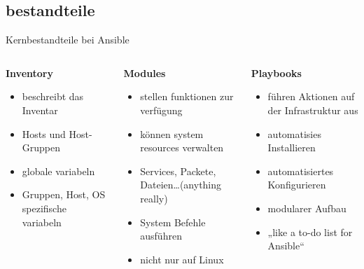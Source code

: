 \documentclass[aspectratio=169]{beamer}
\begin{document}
\subsection{bestandteile} 
\begin{frame}{Kernbestandteile bei Ansible}
    \begin{columns}
        \begin{column}{0.33\textwidth}
            \textbf{Inventory}
            \begin{itemize}
                \item beschreibt das Inventar
                \item Hosts und Host-Gruppen
                \item globale variabeln
                \item Gruppen, Host, OS spezifische variabeln
            \end{itemize}
        \end{column}
        \pause
        \begin{column}{0.33\textwidth}
            \textbf{Modules}
            \begin{itemize}
                \item stellen funktionen zur verfügung
                \item können system resources verwalten
                \item Services, Packete, Dateien\ldots (anything really)
                \item System Befehle ausführen
                \item nicht nur auf Linux
            \end{itemize}
        \end{column}
        \pause
        \begin{column}{0.34\textwidth}
            \textbf{Playbooks}
            \begin{itemize}
                \item führen Aktionen auf der Infrastruktur aus
                \item automatisies Installieren
                \item automatisiertes Konfigurieren
                \item modularer Aufbau
                \item „like a to-do list for Ansible“
            \end{itemize}
        \end{column}
    \end{columns}
\end{frame}
\end{document}
